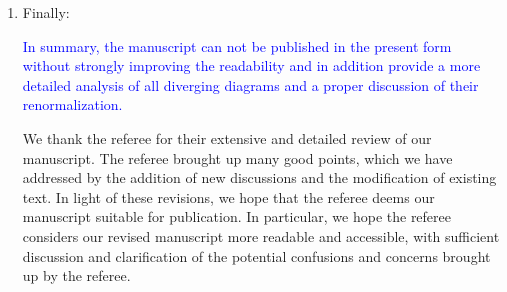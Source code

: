 \documentclass[preprint]{revtex4-1}
\newcommand{\1}{\mathds{1}}
\newcommand{\blue}[1]{\textcolor{blue}{#1}}
\begin{document}
\begin{enumerate}
\item Finally:

  \blue{In summary, the manuscript can not be published in the present
    form without strongly improving the readability and in addition
    provide a more detailed analysis of all diverging diagrams and a
    proper discussion of their renormalization.}

  We thank the referee for their extensive and detailed review of our
  manuscript.  The referee brought up many good points, which we have
  addressed by the addition of new discussions and the modification of
  existing text.  In light of these revisions, we hope that the
  referee deems our manuscript suitable for publication.  In
  particular, we hope the referee considers our revised manuscript
  more readable and accessible, with sufficient discussion and
  clarification of the potential confusions and concerns brought up by
  the referee.

\end{enumerate}
\end{document}
